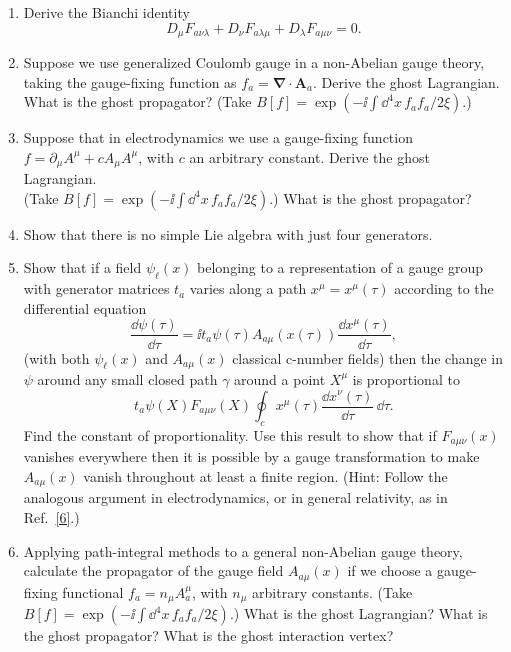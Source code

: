 

\begin{enumerate}
  \item Derive the Bianchi identity
  \[
    D_\mu F_{a\nu\lambda}+D_\nu F_{a\lambda\mu}
    +D_\lambda F_{a\mu\nu}=0.
  \]

  \item Suppose we use generalized Coulomb gauge in a non-Abelian gauge theory, taking the gauge-fixing function as $f_a=\boldsymbol\nabla\cdot\mathbf A_a$. Derive the ghost Lagrangian. What is the ghost propagator? (Take $B[f]=\exp(-\ii\int \dd^4x\,f_a f_a/2\xi)$.)

  \item Suppose that in electrodynamics we use a gauge-fixing function $f=\partial_\mu A^\mu+cA_\mu A^\mu$, with $c$ an arbitrary constant. Derive the ghost Lagrangian.\\
  (Take $B[f]=\exp(-\ii\int \dd^4x\,f_a f_a/2\xi)$.) What is the ghost propagator?

  \item Show that there is no simple Lie algebra with just four generators.

  \item Show that if a field $\psi_\ell(x)$ belonging to a representation of a gauge group with generator matrices $t_a$ varies along a path $x^\mu=x^\mu(\tau)$ according to the differential equation
  \[
    \frac{\dd\psi(\tau)}{\dd\tau}
    =\ii t_a\psi(\tau)A_{a\mu}(x(\tau))\frac{\dd x^\mu(\tau)}{\dd\tau},
  \]
  (with both $\psi_\ell(x)$ and $A_{a\mu}(x)$ classical c-number fields) then the change in $\psi$ around any small closed path $\gamma$ around a point $X^\mu$ is proportional to
  \[
    t_a\psi(X)F_{a\mu\nu}(X)
    \oint_c x^\mu(\tau)\frac{\dd x^\nu(\tau)}{\dd\tau}\,\dd\tau.
  \]
  Find the constant of proportionality. Use this result to show that if $F_{a\mu\nu}(x)$ vanishes everywhere then it is possible by a gauge transformation to make $A_{a\mu}(x)$ vanish throughout at least a finite region. (Hint: Follow the analogous argument in electrodynamics, or in general relativity, as in Ref.~\hyperref[ch15-ref-6]{[6]}.)

  \item Applying path-integral methods to a general non-Abelian gauge theory, calculate the propagator of the gauge field $A_{a\mu}(x)$ if we choose a gauge-fixing functional $f_a=n_\mu A_a^\mu$, with $n_\mu$ arbitrary constants. (Take $B[f]=\exp(-\ii\int \dd^4x\,f_a f_a/2\xi)$.) What is the ghost Lagrangian? What is the ghost propagator? What is the ghost interaction vertex?


\end{enumerate}

